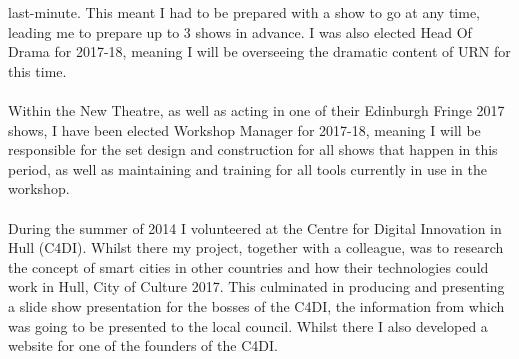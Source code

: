 \documentclass[12pt, a4paper]{article}
\begin{document}
last-minute. This meant I had to be prepared with a show to go at any time, leading me to prepare up to 3 shows in
advance. I was also elected Head Of Drama for 2017-18, meaning I will be overseeing the dramatic content of URN for this
time.\\
\\
Within the New Theatre, as well as acting in one of their Edinburgh Fringe 2017 shows, I have been elected Workshop
Manager for 2017-18, meaning I will be responsible for the set design and construction for all shows that happen in this
period, as well as maintaining and training for all tools currently in use in the workshop.\\
\\
During the summer of 2014 I volunteered at the Centre for Digital Innovation in Hull (C4DI).
Whilst there my project, together with a colleague, was to research the concept of smart cities in other countries and how their technologies could work in Hull, City of Culture 2017.
This culminated in producing and presenting a slide show presentation for the bosses of the C4DI, the information from which was going to be presented to the local council.
Whilst there I also developed a website for one of the founders of the C4DI.\\
\end{document}
